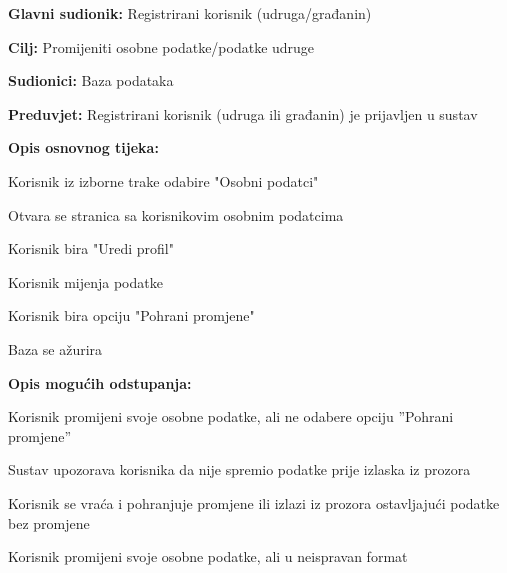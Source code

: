 				\noindent {}
			\begin{packed_item}
				
				\item \textbf{Glavni sudionik:} Registrirani korisnik (udruga/građanin)
				\item  \textbf{Cilj:} Promijeniti osobne podatke/podatke udruge
				\item  \textbf{Sudionici:} Baza podataka
				\item  \textbf{Preduvjet:} Registrirani korisnik (udruga ili građanin) je prijavljen u sustav
				\item  \textbf{Opis osnovnog tijeka:}
				
				\item[] \begin{packed_enum}
					\item Korisnik iz izborne trake odabire "Osobni podatci"
					\item Otvara se stranica sa korisnikovim osobnim podatcima
					\item Korisnik bira "Uredi profil"
					\item Korisnik mijenja podatke
					\item Korisnik bira opciju "Pohrani promjene"
					\item Baza se ažurira
				\end{packed_enum}
				
				\item  \textbf{Opis mogućih odstupanja:}
				
				\item[] \begin{packed_item}
					
					\item [4.a]  Korisnik promijeni svoje osobne podatke, ali ne odabere opciju ”Pohrani
					promjene”
					\item[] \begin{packed_enum}
						
						\item Sustav upozorava korisnika da nije spremio podatke prije izlaska iz prozora
						\item Korisnik se vraća i pohranjuje promjene ili izlazi iz prozora ostavljajući podatke bez promjene
					\end{packed_enum}
				
					\item [4.b]  Korisnik promijeni svoje osobne podatke, ali u neispravan format
					\item[] \begin{packed_enum}
						

\end{packed_enum}
\end{packed_item}
\end{packed_item}

